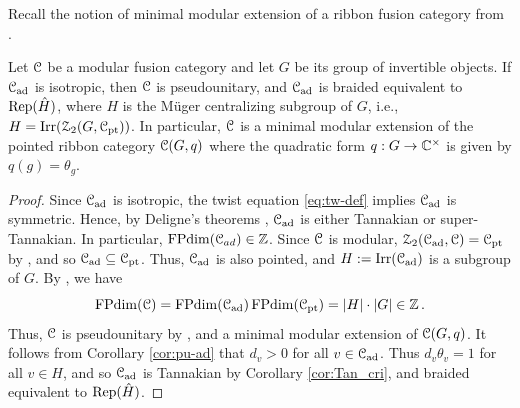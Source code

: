 \documentclass[11pt]{article}
\begin{document}
Recall the notion of minimal modular extension of a ribbon fusion category from \cite{Mug03S}.

\begin{lemma} \label{l:integral}
Let ${\mathcal{C}}$ be a modular fusion category and let $G$ be its group of invertible objects. If ${\mathcal{C}}_{\operatorname{ad}}$ is isotropic, then $\mathcal{C}$ is pseudounitary, and $\mathcal{C}_{{\operatorname{ad}}}$ is braided equivalent to ${\operatorname{Rep}}(\hat{H})$, where $H$ is the M\"uger centralizing subgroup of $G$, i.e., $H = {\operatorname{Irr}}(\mathcal{Z}_2(G, \mathcal{C}_{\operatorname{pt}}))$. In particular, ${\mathcal{C}}$ is a minimal modular extension of the pointed ribbon category ${\mathcal{C}}(G, q)$ where the quadratic form $q: G \rightarrow \mathbb{C}^\times$ is given by $q(g) = \theta_g$. 
\end{lemma}
\begin{proof}
Since ${\mathcal{C}}_{\operatorname{ad}}$ is isotropic, the twist equation \eqref{eq:tw-def} implies ${\mathcal{C}}_{\operatorname{ad}}$ is symmetric. 
Hence, by Deligne's theorems \cite{Del02}, ${\mathcal{C}}_{\operatorname{ad}}$ is either Tannakian or super-Tannakian. In particular, $\operatorname{FPdim}({\mathcal{C}}_{ad}) \in {\mathbb{Z}}$.  Since $\mathcal{C}$ is modular,
$\mathcal{Z}_2({\mathcal{C}}_{\operatorname{ad}}, \mathcal{C})={\mathcal{C}}_{\operatorname{pt}}$ by \cite[Cor.\ 3.27]{DGNO-BFC}, and so ${\mathcal{C}}_{\operatorname{ad}} \subseteq {\mathcal{C}}_{\operatorname{pt}}$. Thus, ${\mathcal{C}}_{\operatorname{ad}}$ is also pointed, and $H:= {\operatorname{Irr}}({\mathcal{C}}_{{\operatorname{ad}}})$ is a subgroup of $G$. By \cite[Cor.~3.14]{DGNO-BFC}, we have 
\[\operatorname{FPdim}({\mathcal{C}}) = \operatorname{FPdim}({\mathcal{C}}_{\operatorname{ad}})\operatorname{FPdim}({\mathcal{C}}_{\operatorname{pt}}) = |H| \cdot |G| \in \mathbb{Z}\,.\] 
Thus, $\mathcal{C}$ is pseudounitary by \cite[Prop.~8.24]{ENO05}, and a minimal modular extension of ${\mathcal{C}}(G, q)$. It follows from  Corollary \ref{cor:pu-ad} that $d_v > 0$ for all $v \in \mathcal{C}_{\operatorname{ad}}$. Thus $d_v \theta_v =1$ for all $v \in H$,  and so $\mathcal{C}_{\operatorname{ad}}$ is Tannakian by Corollary \ref{cor:Tan_cri}, and braided equivalent to ${\operatorname{Rep}}(\hat{H})$.
\end{proof}
\end{document}
